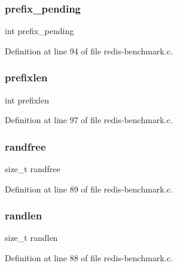 \subsubsection{\texorpdfstring{prefix\+\_\+pending}{prefix\_pending}}
{\footnotesize\ttfamily int prefix\+\_\+pending}



Definition at line 94 of file redis-\/benchmark.\+c.

\mbox{\label{struct__client_ac83d9308bd3c867fa039482a748e3786}} 
\subsubsection{\texorpdfstring{prefixlen}{prefixlen}}
{\footnotesize\ttfamily int prefixlen}



Definition at line 97 of file redis-\/benchmark.\+c.

\mbox{\label{struct__client_a333df7fd0ccc1e7b0a3361c117906f8c}} 
\subsubsection{\texorpdfstring{randfree}{randfree}}
{\footnotesize\ttfamily size\+\_\+t randfree}



Definition at line 89 of file redis-\/benchmark.\+c.

\mbox{\label{struct__client_a3f7e41f5bca97f81c01a6f1783f39213}} 
\subsubsection{\texorpdfstring{randlen}{randlen}}
{\footnotesize\ttfamily size\+\_\+t randlen}



Definition at line 88 of file redis-\/benchmark.\+c.

\mbox{\label{struct__client_a12d52dbd99fe44a6384f67bf2c5f4039}} 
